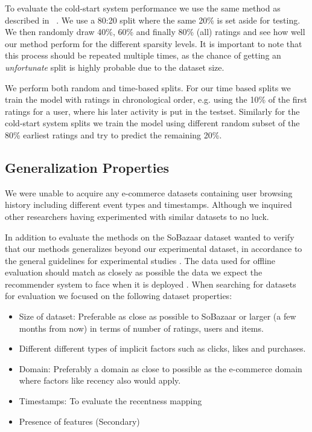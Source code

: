 To evaluate the cold-start system performance we use the same method as
described in ~\cite{Agarwal2009}. We use a 80:20 split where the same 20\% is set
aside for testing. We then randomly draw 40\%, 60\% and finally 80\% (all) ratings
and see how well our method perform for the different sparsity levels.
It is important to note that this process should be repeated multiple times, as
the chance of getting an \emph{unfortunate} split is highly probable due to the
dataset size.

We perform both random and time-based splits. For our time based
splits we train the model with ratings in chronological order, e.g. using
the 10\% of the first ratings for a user, where his later activity is put in the testset.
Similarly for the cold-start system splits we train the model using different random subset
of the 80\% earliest ratings and try to predict the remaining 20\%.

\subsection{Generalization Properties}

We were unable to acquire any e-commerce datasets containing user browsing history including different
event types and timestamps. Although we inquired other researchers having experimented with similar
datasets to no luck.

In addition to evaluate the methods on the SoBazaar dataset wanted to verify that our
methods generalizes beyond our experimental dataset, in accordance to the general guidelines
for experimental studies \cite{Shani2011}. The data used for offline evaluation should match
as closely as possible the data we expect the recommender system to face when it is
deployed \cite{Gunawardana2009}. When searching for datasets for evaluation we focused on the
following dataset properties:

\begin{itemize}
	\item Size of dataset: Preferable as close as possible to SoBazaar or larger (a few months from now)
	in terms of number of ratings, users and items.
	\item Different different types of implicit factors	such as clicks, likes and purchases.
	\item Domain: Preferably a domain as close to possible as the e-commerce domain where
	factors like recency also would apply.
	\item Timestamps: To evaluate the recentness mapping
	\item Presence of features (Secondary)
\end{itemize}





